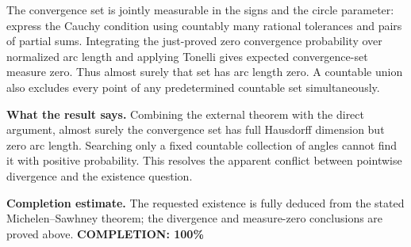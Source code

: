 The convergence set is jointly measurable in the signs and the circle parameter: express the Cauchy condition using countably many rational tolerances and pairs of partial sums. Integrating the just-proved zero convergence probability over normalized arc length and applying Tonelli gives expected convergence-set measure zero. Thus almost surely that set has arc length zero. A countable union also excludes every point of any predetermined countable set simultaneously.

\textbf{What the result says.}
Combining the external theorem with the direct argument, almost surely the convergence set has full Hausdorff dimension but zero arc length. Searching only a fixed countable collection of angles cannot find it with positive probability. This resolves the apparent conflict between pointwise divergence and the existence question.

\textbf{Completion estimate.}
The requested existence is fully deduced from the stated Michelen--Sawhney theorem; the divergence and measure-zero conclusions are proved above.
\textbf{COMPLETION: 100\%}
